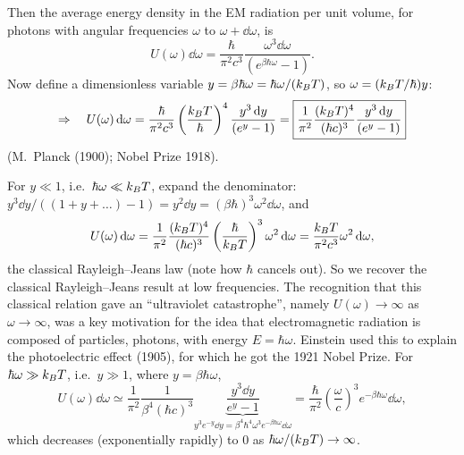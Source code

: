 Then the average energy density in the EM radiation per unit volume, for photons with angular frequencies $\omega$ to
$\omega+\dd\omega$, is
\begin{equation}
  \boxed{U(\omega)\dd\omega = \frac{\hbar}{\pi^2c^3}\frac{\omega^3\dd\omega}{(e^{\beta\hbar\omega}-1)}}.
\end{equation}
Now define a dimensionless variable $y = \beta\hbar\omega = \hbar\omega/(k_{B} T)$, so $\omega = (k_{B} T/\hbar)y$:
\begin{equation}
  \Rightarrow\quad U(\omega)\mathop{}\!\mathrm{d}\omega = \frac{\hbar}{\pi^2c^3}\left(\frac{k_{B} T}{\hbar}\right)^4\frac{y^3\mathop{}\!\mathrm{d} y}{(e^y-1)}
  = \boxed{\frac{1}{\pi^2}\frac{(k_{B} T)^4}{(\hbar c)^3}\frac{y^3\mathop{}\!\mathrm{d} y}{(e^y-1)}}
\end{equation}
(M.~Planck (1900); Nobel Prize 1918).

\begin{diagram}
\end{diagram}

For $y\ll 1$, i.e.\ $\hbar\omega\ll k_{B} T$, expand the denominator:
$y^3\dd y/((1+y+\ldots)-1) = y^2\dd y = (\beta\hbar)^3\omega^2\dd\omega$, and
\begin{equation}
  U(\omega)\mathop{}\!\mathrm{d}\omega = \frac{1}{\pi^2}\frac{(k_{B} T)^4}{(\hbar c)^3}\left(\frac{\hbar}{k_{B} T}\right)^3\omega^2\mathop{}\!\mathrm{d}\omega
  = \frac{k_{B} T}{\pi^2c^3}\omega^2\mathop{}\!\mathrm{d}\omega,
\end{equation}
the classical Rayleigh--Jeans law (note how $\hbar$ cancels out). So we recover the classical Rayleigh--Jeans result at low
frequencies. The recognition that this classical relation gave an ``ultraviolet catastrophe'', namely $U(\omega)\to\infty$ as
$\omega\to\infty$, was a key motivation for the idea that electromagnetic radiation is composed of particles, photons, with
energy $E = \hbar\omega$. Einstein used this to explain the photoelectric effect (1905), for which he got the 1921 Nobel Prize.
For $\hbar\omega\gg k_{B} T$, i.e.\ $y\gg 1$, where $y = \beta\hbar\omega$,
\begin{equation}
  U(\omega)\dd\omega\simeq\frac{1}{\pi^2}\frac{1}{\beta^4(\hbar c)^3}\underbrace{\frac{y^3\dd y}{e^y-1}}_{y^3e^{-y}\dd y = \beta^4\hbar^4\omega^3e^{-\beta\hbar\omega}\dd\omega}
  = \frac{\hbar}{\pi^2}\left(\frac{\omega}{c}\right)^3e^{-\beta\hbar\omega}\dd\omega,
\end{equation}
which decreases (exponentially rapidly) to 0 as $\hbar\omega/(k_{B} T)\to\infty$.

